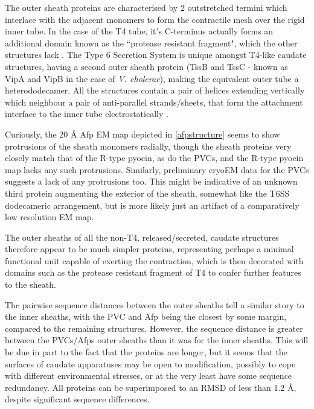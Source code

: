The outer sheath proteins are characterised by 2 outstretched termini which interlace with the adjacent monomers to form the contractile mesh over the rigid inner tube. In the case of the T4 tube, it's C-terminus actually forms an additional domain known as the ``protease resistant fragment", which the other structures lack \citep{Aksyuk2009}. The Type 6 Secretion System is unique amongst T4-like caudate structures, having a second outer sheath protein (TssB and TssC - known as VipA and VipB in the case of \emph{V. cholerae}), making the equivalent outer tube a heterododecamer. All the structures contain a pair of helices extending vertically which neighbour a pair of anti-parallel strands/sheets, that form the attachment interface to the inner tube electrostatically \citep{Ge2015}.

Curiously, the 20 \AA{} Afp EM map depicted in \vref{afpstructure} seems to show protrusions of the sheath monomers radially, though the sheath proteins very closely match that of the R-type pyocin, as do the PVCs, and the R-type pyocin map lacks any such protrusions. Similarly, preliminary cryoEM data for the PVCs suggests a lack of any protrusions too. This might be indicative of an unknown third protein augmenting the exterior of the sheath, somewhat like the T6SS dodecameric arrangement, but is more likely just an artifact of a comparatively low resolution EM map.

The outer sheaths of all the non-T4, released/secreted, caudate structures therefore appear to be much simpler proteins, representing perhaps a minimal functional unit capable of exerting the contraction, which is then decorated with domains such as the protease resistant fragment of T4 to confer further features to the sheath.

The pairwise sequence distances between the outer sheaths tell a similar story to the inner sheaths, with the PVC and Afp being the closest by some margin, compared to the remaining structures. However, the sequence distance is greater between the PVCs/Afps outer sheaths than it was for the inner sheaths. This will be due in part to the fact that the proteins are longer, but it seems that the surfaces of caudate apparatuses may be open to modification, possibly to cope with different environmental stresses, or at the very least have some sequence redundancy. All proteins can be superimposed to an RMSD of less than 1.2 \AA, despite significant sequence differences.

